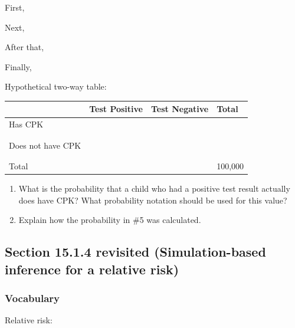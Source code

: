 \documentclass[
]{report}
\newcommand{\rgs}{\vspace{12pt}} %
\newcommand{\rgi}{\hspace{24pt}}  %
\begin{document}
\rgi First,
\rgs

\rgi Next,
\rgs

\rgi After that,
\rgs

\rgi Finally,
\rgs

\rgi Hypothetical two-way table:

\begin{center}
\begin{tabular}{|l|p{1.3in}|p{1.3in}|p{1.3in}|}
\hline
&   Test Positive   & Test Negative & Total \\ \hline
Has CPK     & & & \\
    & & & \\
    & & & \\ \hline
Does not have CPK       & & & \\
    & & & \\
    & & & \\ \hline
Total & & & 100,000 \\ \hline
\end{tabular}
\end{center}
\rgs

\begin{enumerate}
\def\labelenumi{\arabic{enumi}.}
\setcounter{enumi}{4}
\item
  What is the probability that a child who had a positive test result actually does have CPK? What probability notation should be used for this value?
  \rgs
\item
  Explain how the probability in \#5 was calculated.
\end{enumerate}

\newpage

\hypertarget{section-15.1.4-revisited-simulation-based-inference-for-a-relative-risk}{%
\subsection*{Section 15.1.4 revisited (Simulation-based inference for a relative risk)}\label{section-15.1.4-revisited-simulation-based-inference-for-a-relative-risk}}

\hypertarget{vocabulary-5}{%
\subsubsection*{Vocabulary}\label{vocabulary-5}}

Relative risk:
\rgs
\end{document}
